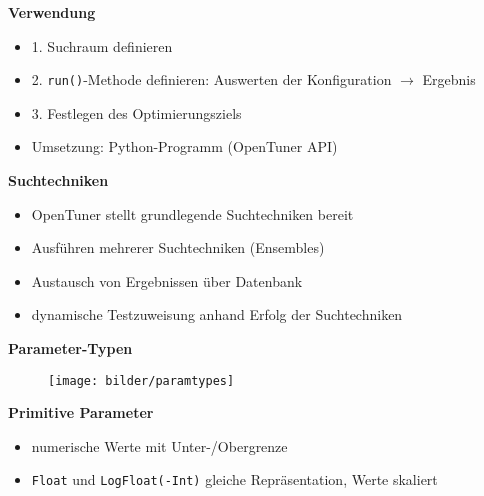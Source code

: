   \begingroup
  \begin{frame}
  \textbf{Verwendung}
  \begin{itemize}
    \item 1. Suchraum definieren 
    \item 2. \texttt{run()}-Methode definieren: Auswerten der Konfiguration $\rightarrow$ Ergebnis
    \item 3. Festlegen des Optimierungsziels
    \item Umsetzung: Python-Programm (OpenTuner API) \newline
    
  \end{itemize}
  \textbf{Suchtechniken}
  \begin{itemize}
    \item OpenTuner stellt grundlegende Suchtechniken bereit
    \item Ausführen mehrerer Suchtechniken (Ensembles)
    \item Austausch von Ergebnissen über Datenbank

    \item dynamische Testzuweisung anhand Erfolg der Suchtechniken

    
  \end{itemize}
  \end{frame}
  \endgroup
    
  \begingroup
  \begin{frame}
    \textbf{Parameter-Typen}
    \begin{figure}[ht]
      \centering	      
      \texttt{[image: bilder/paramtypes]}
      \label{paramtypes}
    \end{figure}
    
  \textbf{Primitive Parameter}
  \begin{itemize}
    \item numerische Werte mit Unter-/Obergrenze
    \item \texttt{Float} und \texttt{LogFloat(-Int)} gleiche Repräsentation, Werte skaliert
    
  \end{itemize}
  \end{frame}
  \endgroup
  
